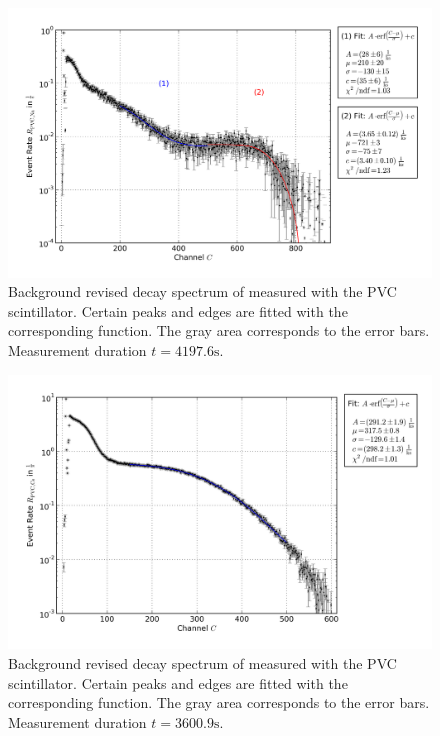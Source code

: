 \begin{figure}[h!]
  \centering
  \includegraphics[width=1.0\textwidth]{plots/pvc_na.png}
  \caption{Background revised decay spectrum of \Na measured with the PVC
  scintillator. Certain peaks and edges are fitted with the corresponding
  function. The gray area corresponds to the error bars. Measurement
  duration $t=4197.6\mathrm{s}$.}
  \label{fig:calibPVCNa}
\end{figure}

\begin{figure}[h!]
  \centering
  \includegraphics[width=1.0\textwidth]{plots/pvc_cs.png}
  \caption{Background revised decay spectrum of \Cs measured with the PVC
  scintillator. Certain peaks and edges are fitted with the corresponding
  function. The gray area corresponds to the error bars. Measurement
  duration $t=3600.9\mathrm{s}$.}
  \label{fig:calibPVCCs}
\end{figure}

